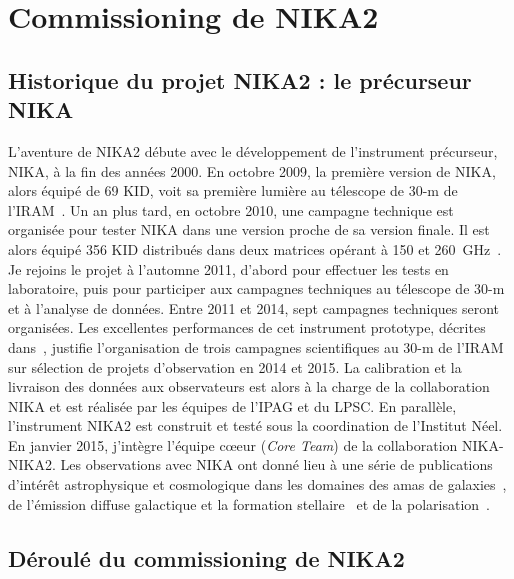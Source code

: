 %
%
%
%
%
%
%
\section{Commissioning de NIKA2}
\label{se:commissioning}

\subsection{Historique du projet NIKA2 : le précurseur NIKA}
\label{se:nika}

L'aventure de NIKA2 débute avec le développement de l'instrument
précurseur, NIKA, à la fin des années 2000. En octobre 2009, la
première version de NIKA, alors équipé de 69 KID, voit sa première
lumière au télescope de 30-m de l'IRAM~\citep{Monfardini2010_NIKA}. Un
an plus tard, en octobre 2010, une campagne technique est organisée
pour tester NIKA dans une version proche de sa version finale. Il est
alors équipé 356 KID distribués dans deux matrices opérant à 150 et
260~GHz~\citep{Monfardini2011_NIKA}. Je rejoins le projet à l'automne
2011, d'abord pour effectuer les tests en laboratoire, puis pour
participer aux campagnes techniques au télescope de 30-m et à
l'analyse de données. Entre 2011
et 2014, sept campagnes techniques seront organisées. Les excellentes
performances de cet instrument prototype, décrites
dans~\citet{Catalano2014}, justifie l'organisation de trois campagnes
scientifiques au 30-m de l'IRAM sur sélection de projets d'observation
en 2014 et 2015. La calibration et
la livraison des données aux observateurs est alors à la charge de la
collaboration NIKA et est réalisée par les équipes de l'IPAG et du
LPSC. En parallèle, l'instrument NIKA2 est construit et testé sous
la coordination de l'Institut Néel. En janvier 2015, j'intègre
l'équipe c\oe eur (\emph{Core Team}) de la collaboration NIKA-NIKA2. Les
observations avec NIKA ont donné lieu à une série de publications
d'intérêt astrophysique et cosmologique dans les domaines des amas de
galaxies~\citep{Adam2014, Adam2015, Adam2016, Adam2017, Adam2017kSZ,
  Adam2018, Ruppin2017, Romero2018}, de l'émission diffuse
galactique et la formation stellaire~\citep{Bracco2017, Chacon2017,
  Rigby2018} et de la polarisation~\citep{Ritacco2018}.

\subsection{Déroulé du commissioning de NIKA2}
\label{se:historic}

